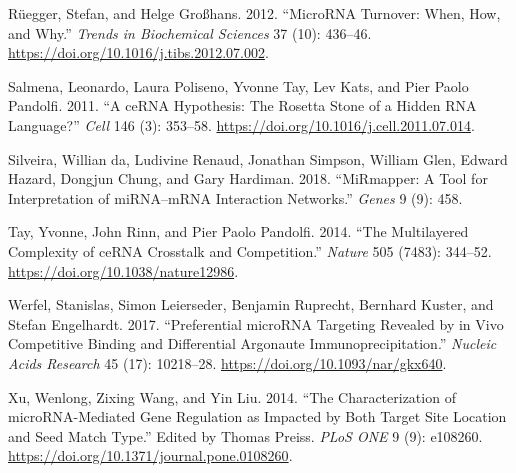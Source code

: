 \documentclass[]{article}
\begin{document}
\leavevmode\hypertarget{ref-ruegger_microrna_2012}{}%
Rüegger, Stefan, and Helge Großhans. 2012. ``MicroRNA Turnover: When,
How, and Why.'' \emph{Trends in Biochemical Sciences} 37 (10): 436--46.
\url{https://doi.org/10.1016/j.tibs.2012.07.002}.

\leavevmode\hypertarget{ref-salmena_cerna_2011}{}%
Salmena, Leonardo, Laura Poliseno, Yvonne Tay, Lev Kats, and Pier Paolo
Pandolfi. 2011. ``A ceRNA Hypothesis: The Rosetta Stone of a Hidden RNA
Language?'' \emph{Cell} 146 (3): 353--58.
\url{https://doi.org/10.1016/j.cell.2011.07.014}.

\leavevmode\hypertarget{ref-da2018mirmapper}{}%
Silveira, Willian da, Ludivine Renaud, Jonathan Simpson, William Glen,
Edward Hazard, Dongjun Chung, and Gary Hardiman. 2018. ``MiRmapper: A
Tool for Interpretation of miRNA--mRNA Interaction Networks.''
\emph{Genes} 9 (9): 458.

\leavevmode\hypertarget{ref-tay_multilayered_2014}{}%
Tay, Yvonne, John Rinn, and Pier Paolo Pandolfi. 2014. ``The
Multilayered Complexity of ceRNA Crosstalk and Competition.''
\emph{Nature} 505 (7483): 344--52.
\url{https://doi.org/10.1038/nature12986}.

\leavevmode\hypertarget{ref-werfel_preferential_2017}{}%
Werfel, Stanislas, Simon Leierseder, Benjamin Ruprecht, Bernhard Kuster,
and Stefan Engelhardt. 2017. ``Preferential microRNA Targeting Revealed
by in Vivo Competitive Binding and Differential Argonaute
Immunoprecipitation.'' \emph{Nucleic Acids Research} 45 (17): 10218--28.
\url{https://doi.org/10.1093/nar/gkx640}.

\leavevmode\hypertarget{ref-xu_characterization_2014}{}%
Xu, Wenlong, Zixing Wang, and Yin Liu. 2014. ``The Characterization of
microRNA-Mediated Gene Regulation as Impacted by Both Target Site
Location and Seed Match Type.'' Edited by Thomas Preiss. \emph{PLoS ONE}
9 (9): e108260. \url{https://doi.org/10.1371/journal.pone.0108260}.
\end{document}
